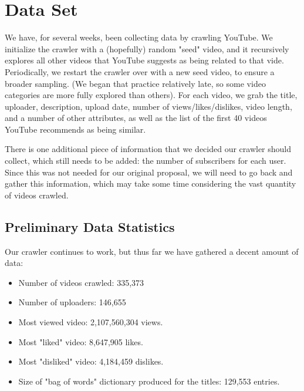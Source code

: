 \documentclass{article} %
\begin{document}
\section{Data Set}

We have, for several weeks, been collecting data by crawling YouTube.  We initialize the crawler with a (hopefully) random "seed" video, and it recursively explores all other videos that YouTube suggests as being related to that vide.  Periodically, we restart the crawler over with a new seed video, to ensure a broader sampling.  (We began that practice relatively late, so some video categories are more fully explored than others).  For each video, we grab the title, uploader, description, upload date, number of views/likes/dislikes, video length, and a number of other attributes, as well as the list of the first 40 videos YouTube recommends as being similar.

There is one additional piece of information that we decided our crawler should collect, which still needs to be added: the number of subscribers for each user.  Since this was not needed for our original proposal, we will need to go back and gather this information, which may take some time considering the vast quantity of videos crawled.

\subsection{Preliminary Data Statistics}

Our crawler continues to work, but thus far we have gathered a decent amount of data:

\begin{itemize}
\item Number of videos crawled: 335,373
\item Number of uploaders: 146,655
\item Most viewed video: 2,107,560,304 views.
\item Most "liked" video: 8,647,905 likes.
\item Most "disliked" video: 4,184,459 dislikes.
\item Size of "bag of words" dictionary produced for the titles: 129,553 entries.
\end{itemize}
\end{document}
